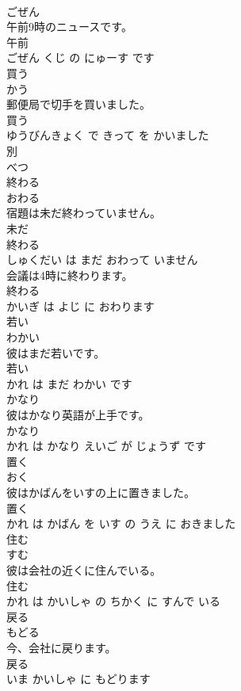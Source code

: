 \documentclass[8pt]{extreport}
\begin{document}
\begin{CJK}{UTF8}{min}
\\	ごぜん			
\\	午前9時のニュースです。	
\\	午前 
\\	ごぜん くじ の にゅーす です			
\\	買う	
\\	かう			
\\	郵便局で切手を買いました。	
\\	買う 
\\	ゆうびんきょく で きって を かいました			
\\	別	
\\	べつ			
\\	終わる	
\\	おわる			
\\	宿題は未だ終わっていません。	
\\	未だ 
\\	終わる 
\\	しゅくだい は まだ おわって いません			
\\	会議は4時に終わります。	
\\	終わる 
\\	かいぎ は よじ に おわります			
\\	若い	
\\	わかい			
\\	彼はまだ若いです。	
\\	若い 
\\	かれ は まだ わかい です			
\\	かなり	
\\	彼はかなり英語が上手です。	
\\	かなり 
\\	かれ は かなり えいご が じょうず です			
\\	置く	
\\	おく			
\\	彼はかばんをいすの上に置きました。	
\\	置く 
\\	かれ は かばん を いす の うえ に おきました			
\\	住む	
\\	すむ			
\\	彼は会社の近くに住んでいる。	
\\	住む 
\\	かれ は かいしゃ の ちかく に すんで いる			
\\	戻る	
\\	もどる			
\\	今、会社に戻ります。	
\\	戻る 
\\	いま かいしゃ に もどります			

\end{CJK}
\end{document}
